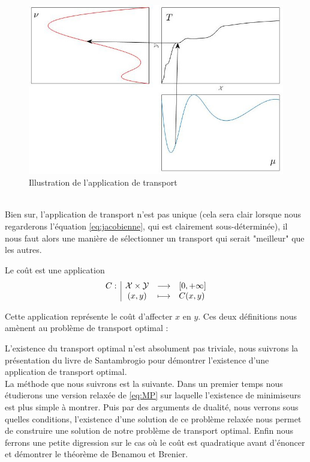 \documentclass[a4paper,12pt]{article}
\begin{document}
\begin{figure}[!h]
\centering
\includegraphics[width=0.7\linewidth]{img/transport.jpg}
\caption{\label{fig:illustrans}Illustration de l'application de transport}
\end{figure}\\
Bien sur, l'application de transport n'est pas unique (cela sera clair lorsque nous regarderons l'équation \eqref{eq:jacobienne}, qui est clairement sous-déterminée), il nous faut alors une manière de sélectionner un transport qui serait "meilleur" que les autres. 

\begin{definition}{}
Le coût est une application 
$$
\begin{array}[t]{l|ccl} C: & \mathcal{X}\times\mathcal{Y} & \longrightarrow & [0,+\infty] \\ & (x,y) & \longmapsto & C(x,y) \end{array}
$$
\end{definition}
Cette application représente le coût d'affecter $x$ en $y$. Ces deux définitions nous amènent au problème de transport optimal : \\

\vspace{0.3cm}

L'existence du transport optimal n'est absolument pas triviale, nous suivrons la présentation du livre de Santambrogio  \cite{santambrogio2015optimal} pour démontrer l'existence d'une application de transport optimal.\\ 
La méthode que nous suivrons est la suivante. Dans un premier temps nous étudierons une version relaxée de \eqref{eq:MP} sur laquelle l'existence de minimiseurs est plus simple à montrer. Puis par des arguments de dualité, nous verrons sous quelles conditions, l'existence d'une solution de ce problème relaxée nous permet de construire une solution de notre problème de transport optimal. Enfin nous ferrons une petite digression sur le cas où le coût est quadratique avant d'énoncer et démontrer le théorème de Benamou et Brenier. 
\end{document}

